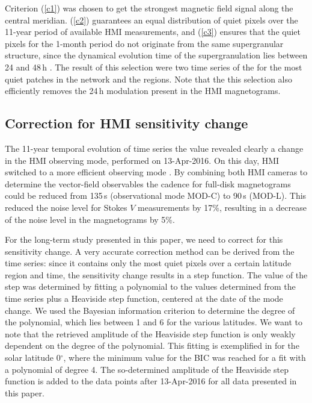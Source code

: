 \documentclass{aa}
\begin{document}
Criterion (\ref{c1}) was chosen to get the strongest magnetic field signal along the central meridian. (\ref{c2}) guarantees an equal distribution of quiet pixels over the 11-year period of available HMI measurements, and (\ref{c3}) ensures that the quiet pixels for the 1-month period do not originate from the same supergranular structure, since the dynamical evolution time of the supergranulation lies between 24 and 48\,h \cite[]{2010LRSP....7....2R}. The result of this selection were two time series of the \brms{} for the most quiet patches in the network and the \IN{} regions. Note that the this selection also efficiently removes the 24\,h modulation present in the HMI magnetograms.

\subsection{Correction for HMI sensitivity change\label{sensicorr}}

The 11-year temporal evolution of \inw{} time series {the \brms{}} value revealed clearly a change in the HMI observing mode, performed on 13-Apr-2016. On this day, HMI switched to a more efficient observing mode \cite[see][]{2018SoPh..293...45H,2014SoPh..289.3483H,2016SoPh..291.1887C}. By combining both HMI cameras to determine the vector-field observables the cadence for full-disk magnetograms could be reduced from 135\,s (observational mode MOD-C) to 90\,s (MOD-L). This reduced the noise level for Stokes $V$ measurements by 17\%, resulting in a decrease of the noise level in the \los{} magnetograms by 5\%.

For the long-term study presented in this paper, we need to correct for this sensitivity change. A very accurate correction method can be derived from the \inw{} time series: since it contains only the most quiet pixels over a certain latitude region and time, the sensitivity change results in a step function. The value of the step was determined by fitting a polynomial to the \brms{} values determined from the \inw{} time series plus a Heaviside step function, centered at the date of the mode change. We used the Bayesian information criterion \cite[BIC,][]{Stoica2004} to determine the degree of the polynomial, which lies between 1 and 6 for the various latitudes. We want to note that the retrieved amplitude of the Heaviside step function is only weakly dependent on the degree of the polynomial. This fitting is exemplified in  for the solar latitude 0$^\circ$, where the minimum value for the BIC was reached for a fit with a polynomial of degree 4. The so-determined amplitude of the Heaviside step function is added to the data points after 13-Apr-2016 for all data presented in this paper.
\end{document}
